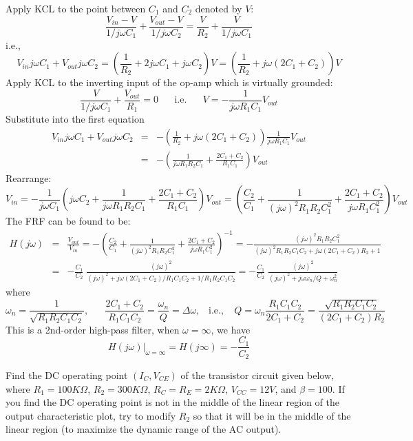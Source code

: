 \begin{enumerate}
Apply KCL to the point between $C_1$ and $C_2$ denoted by $V$:
\[
\frac{V_{in}-V}{1/j\omega C_1}+\frac{V_{out}-V}{1/j\omega C_2}
=\frac{V}{R_2}+\frac{V}{1/j\omega C_1}
\]
i.e.,
\[
V_{in}j\omega C_1+V_{out}j\omega C_2
=\left(\frac{1}{R_2}+2j\omega C_1+j\omega C_2\right) V
=\left(\frac{1}{R_2}+j\omega(2C_1+C_2)\right) V
\]
Apply KCL to the inverting input of the op-amp which is virtually
grounded:
\[
\frac{V}{1/j\omega C_1}+\frac{V_{out}}{R_1}=0
\;\;\;\;\;\;\mbox{i.e.}\;\;\;\;\;\;
V=-\frac{1}{j\omega R_1C_1}V_{out}
\]
Substitute into the first equation
\begin{eqnarray}
  V_{in}j\omega C_1+V_{out}j\omega C_2
  &=&-\left(\frac{1}{R_2}+j\omega(2C_1+C_2)\right) \frac{1}{j\omega R_1C_1}V_{out}
  \nonumber\\
  &=&-\left(\frac{1}{j\omega R_1R_2C_1}+\frac{2C_1+C_2}{R_1C_1}\right) V_{out}
  \nonumber
\end{eqnarray}
Rearrange:
\[
V_{in}
=-\frac{1}{j\omega C_1}\left(j\omega C_2+\frac{1}{j\omega R_1R_2C_1}+\frac{2C_1+C_2}{R_1C_1}\right) V_{out}
=\left(\frac{C_2}{C_1}+\frac{1}{(j\omega)^2 R_1R_2C^2_1}
+\frac{2C_1+C_2}{j\omega R_1C_1^2}\right) V_{out}
\]
The FRF can be found to be:
\begin{eqnarray}
H(j\omega)&=&\frac{V_{out}}{V_{in}}
=-\left(\frac{C_2}{C_1}+\frac{1}{(j\omega)^2 R_1R_2C_1^2}
+\frac{2C_1+C_2}{j\omega R_1C_1^2}\right)^{-1}
=-\frac{(j\omega)^2R_1R_2C_1^2}{(j\omega)^2R_1R_2C_1C_2+j\omega(2C_1+C_2)R_2+1}
\nonumber\\
&=&-\frac{C_1}{C_2}\;\frac{(j\omega)^2}{(j\omega)^2+j\omega(2C_1+C_2)/R_1C_1C_2+1/R_1R_2C_1C_2}
=-\frac{C_1}{C_2}\;\frac{(j\omega)^2}{(j\omega)^2+j\omega\omega_n/Q+\omega_n^2}
\nonumber
\end{eqnarray}
where
\[
\omega_n=\frac{1}{\sqrt{R_1R_2C_1C_2}},\;\;\;\;\;\;
\frac{2C_1+C_2}{R_1C_1C_2}=\frac{\omega_n}{Q}=\Delta\omega,
\;\;\;\mbox{i.e.,}\;\;\;\;
Q=\omega_n\frac{R_1C_1C_2}{2C_1+C_2}=\frac{\sqrt{R_1R_2C_1C_2}}{(2C_1+C_2)R_2}
\]
This is a 2nd-order high-pass filter, when $\omega=\infty$, we have
\[
H(j\omega)\big|_{\omega=\infty}=H(j\infty)=-\frac{C_1}{C_2}
\]


Find the DC operating point $(I_C, V_{CE})$ of the transistor circuit 
given below, where $R_1=100K\Omega$, $R_2=300K\Omega$, $R_C=R_E=2K\Omega$, 
$V_{CC}=12V$, and $\beta=100$. If you find the DC operating point is not 
in the middle of the linear region of the output characteristic plot, try 
to modify $R_2$ so that it will be in the middle of the linear region (to 
maximize the dynamic range of the AC output).


\end{enumerate}
